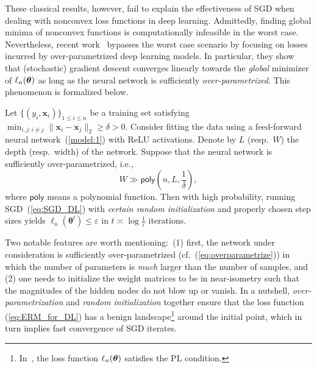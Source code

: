 These classical results, however, fail to explain the effectiveness of SGD when dealing with nonconvex loss functions in deep learning. Admittedly, finding global minima of nonconvex functions is computationally infeasible in the worst case. Nevertheless, recent work~\citep{allen2018convergence,du2018gradient} bypasses the worst case scenario by focusing on losses incurred by over-parametrized deep learning models. In particular, they show that (stochastic) gradient descent converges linearly towards the \emph{global }minimizer of $\ell_{n}(\text{\boldmath $\theta$})$ as long as the neural network is sufficiently \emph{over-parametrized}. This phenomenon is formalized below.

\begin{thm}Let $\{(y_i, \bm{x}_{i})\}_{1 \leq i \leq n}$
be a training set satisfying $\min_{i,j:i\neq j}\|\bm{x}_{i}-\bm{x}_{j}\|_{2}\geq\delta>0$. Consider fitting the data using a feed-forward neural network~(\ref{model:1}) with
ReLU activations. Denote by $L$ (resp.~$W$) the depth (resp.~width) of the network. Suppose that the neural network is sufficiently over-parametrized, i.e.,
\begin{equation}
W\gg\mathsf{poly}\left(n,L,\frac{1}{\delta}\right), \label{eq:overparametrize}
\end{equation}
where $\mathsf{poly}$ means a polynomial function. Then with high probability, running SGD~(\ref{eq:SGD_DL}) with \emph{certain
random initialization} and properly chosen step sizes yields $\ell_{n}(\bm{\theta}^{t})\leq\varepsilon$
in $t\asymp\log\frac{1}{\varepsilon}$ iterations. \end{thm}

Two
notable features are worth mentioning:~(1) first, the network under
consideration is sufficiently over-parametrized (cf.~(\ref{eq:overparametrize})) in which the number of parameters is \emph{much} larger than the number of samples,
and (2) one needs to initialize the weight matrices to be in near-isometry such that the magnitudes of the hidden nodes do not blow up or vanish. In a nutshell, \emph{over-parametrization}
and \emph{random initialization} together ensure that the loss function
(\ref{eq:ERM_for_DL}) has a benign landscape\footnote{In~\cite{allen2018convergence},
the loss function $\ell_{n}(\text{\boldmath $\theta$})$ satisfies the PL condition.} around the initial
point, which in turn implies fast convergence of SGD iterates.


